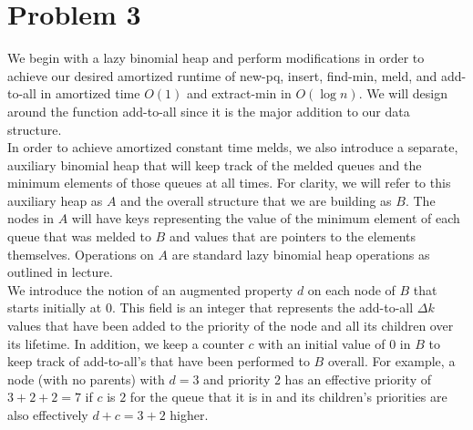 \documentclass{article}
\theoremstyle{casestyle}
\begin{document}


\newpage


\section *{Problem 3}

We begin with a lazy binomial heap and perform modifications in order to achieve our desired  amortized runtime of new-pq, insert, find-min, meld, and add-to-all in amortized time $O(1)$ and extract-min in $O(\log n)$. We will design around the function add-to-all since it is the major addition to our data structure.\\

In order to achieve amortized constant time melds, we also introduce a separate, auxiliary binomial heap that will keep track of the melded queues and the minimum elements of those queues at all times. For clarity, we will refer to this auxiliary heap as $A$ and the overall structure that we are building as $B$. The nodes in $A$ will have keys representing the value of the minimum element of each queue that was melded to $B$ and values that are pointers to the elements themselves. Operations on $A$ are standard lazy binomial heap operations as outlined in lecture.\\

We introduce the notion of an augmented property $d$ on each node of $B$ that starts initially at $0$. This field is an integer that represents the add-to-all $\Delta k$ values that have been added to the priority of the node and all its children over its lifetime. In addition, we keep a counter $c$ with an initial value of 0 in $B$ to keep track of add-to-all's that have been performed to $B$ overall. For example, a node (with no parents) with $d=3$ and priority $2$ has an effective priority of $3+2+2=7$ if $c$ is $2$ for the queue that it is in and its children's priorities are also effectively $d+c=3+2$ higher. \\
\end{document}

